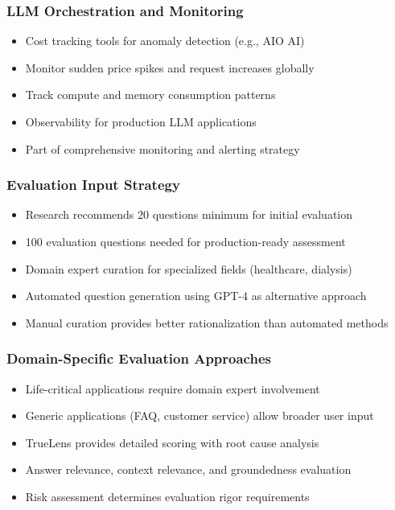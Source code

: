 \begin{frame}[fragile]\frametitle{LLM Orchestration and Monitoring}
      \begin{itemize}
	\item Cost tracking tools for anomaly detection (e.g., AIO AI)
	\item Monitor sudden price spikes and request increases globally
	\item Track compute and memory consumption patterns
	\item Observability for production LLM applications
	\item Part of comprehensive monitoring and alerting strategy
	  \end{itemize}
\end{frame}

\begin{frame}[fragile]\frametitle{Evaluation Input Strategy}
      \begin{itemize}
	\item Research recommends 20 questions minimum for initial evaluation
	\item 100 evaluation questions needed for production-ready assessment
	\item Domain expert curation for specialized fields (healthcare, dialysis)
	\item Automated question generation using GPT-4 as alternative approach
	\item Manual curation provides better rationalization than automated methods
	  \end{itemize}
\end{frame}

\begin{frame}[fragile]\frametitle{Domain-Specific Evaluation Approaches}
      \begin{itemize}
	\item Life-critical applications require domain expert involvement
	\item Generic applications (FAQ, customer service) allow broader user input
	\item TrueLens provides detailed scoring with root cause analysis
	\item Answer relevance, context relevance, and groundedness evaluation
	\item Risk assessment determines evaluation rigor requirements
	  \end{itemize}
\end{frame}

